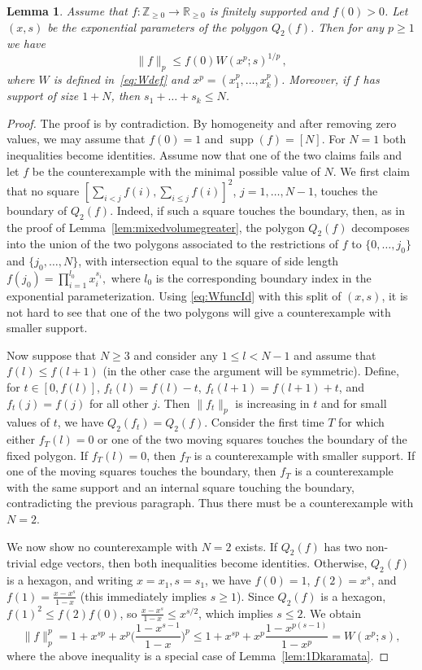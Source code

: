 \documentclass[a4paper,reqno,12pt]{amsart}
\newtheorem{lemma}[theorem]{Lemma}
\newcommand{\z}{\mathbb{Z}}
\renewcommand{\r}{\mathbb{R}}
\newcommand{\1}{\bo{1}}
\begin{document}
\begin{lemma} \label{lem:lpboundF}
	Assume that $f\colon \z_{\ge0}\to\r_{\ge0}$ is finitely supported and $f(0)>0$. Let $(x,s)$ be the exponential parameters of the polygon $Q_2(f)$. Then for any $p\ge1$ we have
	\[\|f\|_p \le f(0)W(x^p;s)^{1/p} \,,\]
	where $W$ is defined in~\eqref{eq:Wdef} and $x^p=(x_1^p,\dots,x_k^p)$. Moreover, if $f$ has support of size $1+N$, then $s_1+\dots+s_k\le N$.
\end{lemma}
\begin{proof}
	The proof is by contradiction. By homogeneity and after removing zero values, we may assume that $f(0)=1$ and $\operatorname{supp}(f)=[N]$.
	For $N=1$ both inequalities become identities. Assume now that one of the two claims fails and let $f$ be the counterexample with the minimal possible value of $N$. We first claim that no square $[\sum_{i<j}f(i),\sum_{i\le j}f(i)]^2$, $j=1,\dots,N-1$, touches the boundary of $Q_2(f)$. Indeed, if such a square touches the boundary, then, as in the proof of Lemma~\ref{lem:mixedvolumegreater}, the polygon $Q_2(f)$ decomposes into the union of the two polygons associated to the restrictions of $f$ to $\{0,\dots,j_0\}$ and $\{j_0,\dots,N\}$, with intersection equal to the square of side length
$
f(j_0)=\prod_{i=1}^{l_0} x_i^{s_i},
$
where $l_0$ is the corresponding boundary index in the exponential parameterization.
Using \eqref{eq:WfuncId} with this split of \((x,s)\), it is not hard to see that one of the two polygons will give a counterexample with smaller support.
	
	Now suppose that $N\ge3$ and consider any $1\le l<N-1$ and assume that $f(l)\le f(l+1)$ (in the other case the argument will be symmetric). Define, for $t\in[0,f(l)]$, $f_t(l)=f(l)-t$, $f_t(l+1)=f(l+1)+t$, and $f_t(j)=f(j)$ for all other $j$. Then $\|f_t\|_p$ is increasing in $t$ and for small values of $t$, we have $Q_2(f_t)=Q_2(f)$. Consider the first time $T$ for which either $f_T(l)=0$ or one of the two moving squares touches the boundary of the fixed polygon. If $f_T(l)=0$, then $f_T$ is a counterexample with smaller support. If one of the moving squares touches the boundary, then $f_T$ is a counterexample with the same support and an internal square touching the boundary, contradicting the previous paragraph. Thus there must be a counterexample with $N=2$.

	We now show no counterexample with $N=2$ exists. If $Q_2(f)$ has two non-trivial edge vectors, then both inequalities become identities. Otherwise, $Q_2(f)$ is a hexagon, and writing $x=x_1,s=s_1$, we have $f(0)=1$, $f(2)=x^{s}$, and $f(1)=\frac{x-x^{s}}{1-x}$ (this immediately implies $s\ge1$). Since $Q_2(f)$ is a hexagon, $f(1)^2\le f(2)f(0)$, so $\frac{x-x^{s}}{1-x} \le x^{s/2}$, which implies $s\le 2$. We obtain
	\[
	\|f\|_p^p = 1+x^{sp} + x^p\Big(\frac{1-x^{s-1}}{1-x}\Big)^{p} \le 1+x^{sp} + x^p\frac{1-x^{p(s-1)}}{1-x^p} = W(x^p;s),
	\]
	where the above inequality is a special case of  Lemma~\ref{lem:1Dkaramata}.
	\end{proof}
\end{document}
